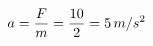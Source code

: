 \documentclass[preview]{standalone}
\begin{document}
\begin{align*}
\special{dvisvgm:raw <g id='unique000'>}a = \frac{F}{m} = \frac{10}{2} = 5\,m/s^2\special{dvisvgm:raw </g>}
\end{align*}
\end{document}
